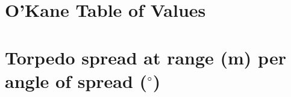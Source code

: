 \documentclass{article}
\newcommand{\degree}{$^{\circ}$}
\begin{document}
\section{O'Kane Table of Values}

\pagebreak

\section{Torpedo spread at range (m) per angle of spread (\degree)}




\end{document}
